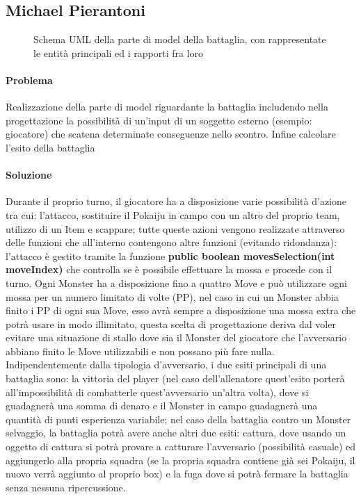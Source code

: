 \subsection*{Michael Pierantoni}

\begin{figure}[H]
\centering

\caption{Schema UML della parte di model della battaglia, con rappresentate le entità principali ed i rapporti fra loro}
\label{img:Battle_UML}
\end{figure}

\paragraph{Problema}
Realizzazione della parte di model riguardante la battaglia includendo nella progettazione la possibilità di un'input di un soggetto esterno (esempio: giocatore) che scatena determinate conseguenze nello scontro. Infine calcolare l'esito della battaglia

\paragraph{Soluzione}

Durante il proprio turno, il giocatore ha a disposizione varie possibilità d'azione tra cui: l'attacco, sostituire il Pokaiju in campo con un altro del proprio team, utilizzo di un Item e scappare; tutte queste azioni vengono realizzate attraverso delle funzioni che all'interno contengono altre funzioni (evitando ridondanza): l'attacco è gestito tramite la funzione \textbf{public boolean movesSelection(int moveIndex)} che controlla se è possibile effettuare la mossa e procede con il turno.
Ogni Monster ha a disposizione fino a quattro Move e può utilizzare ogni mossa per un numero limitato di volte (PP), nel caso in cui un Monster abbia finito i PP di ogni sua Move, esso avrà sempre a disposizione una mossa extra che potrà usare in modo illimitato, questa scelta di progettazione deriva dal voler evitare una situazione di stallo dove sia il Monster del giocatore che l'avversario abbiano finito le Move utilizzabili e non possano più fare nulla.
Indipendentemente dalla tipologia d'avversario, i due esiti principali di una battaglia sono: la vittoria del player (nel caso dell'allenatore quest'esito porterà all'impossibilità di combatterle quest'avversario un'altra volta), dove si guadagnerà una somma di denaro e il Monster in campo guadagnerà una quantità di punti esperienza variabile; nel caso della battaglia contro un Monster selvaggio, la battaglia potrà avere anche altri due esiti: cattura, dove usando un oggetto di cattura si potrà provare a catturare l'avversario (possibilità casuale) ed aggiungerlo alla propria squadra (se la propria squadra contiene già sei Pokaiju, il nuovo verrà aggiunto al proprio box)  e la fuga dove si potrà fermare la battaglia senza nessuna ripercussione.

